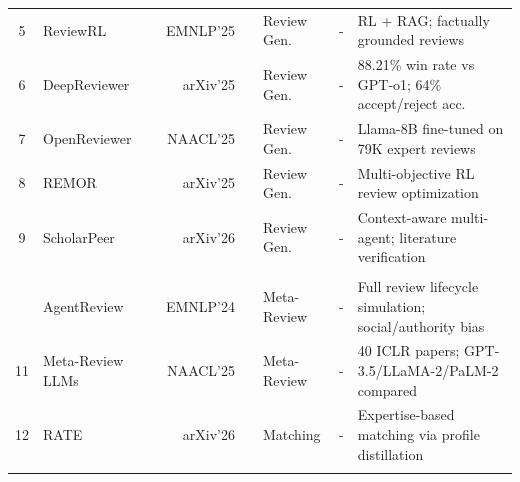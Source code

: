 \documentclass{llmxive}
\begin{document}
\begin{table}[!ht]
{\begin{tabular}{c| >{\centering\arraybackslash}p{3cm} r r |c| >{\centering\arraybackslash}p{2.1cm} |c| p{7.8cm}}
{5}  & ReviewRL & \cite{reviewrl2025} & {\small EMNLP'25} & \href{https://aclanthology.org/2025.emnlp-main.857/}{} & Review Gen.       & -                                                                     & RL + RAG; factually grounded reviews \\
{6}  & DeepReviewer & \cite{deepreviewer2025} & {\small arXiv'25} & \href{https://arxiv.org/abs/2503.08569}{} & Review Gen.       & -                                                                     & 88.21\% win rate vs GPT-o1; 64\% accept/reject acc. \\
{7}  & OpenReviewer & \cite{openreviewer2025} & {\small NAACL'25} & \href{https://aclanthology.org/2025.naacl-demo.44/}{} & Review Gen.       & -                                                                     & Llama-8B fine-tuned on 79K expert reviews \\
{8}  & REMOR & \cite{remor2025} & {\small arXiv'25} & \href{https://arxiv.org/abs/2505.11718}{} & Review Gen.       & -                                                                     & Multi-objective RL review optimization \\
{9}  & ScholarPeer & \cite{scholarpeer2026} & {\small arXiv'26} & \href{https://arxiv.org/abs/2601.22638}{} & Review Gen.       & -                                                                     & Context-aware multi-agent; literature verification \\
\addlinespace[3pt]
\multicolumn{8}{@{}l}{\cellcolor{S6color!65}\textbf{\textsf{~~Meta-Review \& Reviewer Matching}}} \\
\addlinespace[1pt]
{10} & AgentReview & \cite{agentreview2024} & {\small EMNLP'24} & \href{https://aclanthology.org/2024.emnlp-main.70/}{} & Meta-Review      & -                                                                     & Full review lifecycle simulation; social/authority bias \\
{11} & Meta-Review LLMs & \cite{metareviewllm2024} & {\small NAACL'25} & \href{https://aclanthology.org/2025.naacl-long.395/}{} & Meta-Review      & -                                                                     & 40 ICLR papers; GPT-3.5/LLaMA-2/PaLM-2 compared \\
{12} & RATE & \cite{rate2026} & {\small arXiv'26} & \href{https://arxiv.org/abs/2601.19637}{} & Matching         & -                                                                     & Expertise-based matching via profile distillation \\
\addlinespace[3pt]
\multicolumn{8}{@{}l}{\cellcolor{S6color!65}\textbf{\textsf{~~Adversarial Attacks \& Bias Analysis}}} \\

\end{tabular}}
\end{table}
\end{document}
